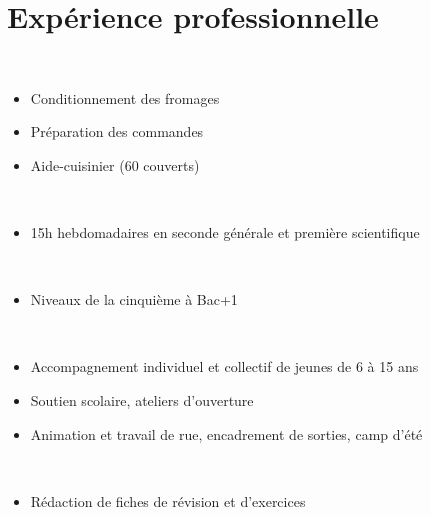 \documentclass[]{cv-template}
\begin{document}
\begin{minipage}[t]{0.65\textwidth} 

\section{Expérience professionnelle}

\\
\begin{itemize}
\item Conditionnement des fromages
\item Préparation des commandes
\item Aide-cuisinier (60 couverts)
\end{itemize}
\sectionsep

 \\
\begin{itemize}
\item 15h hebdomadaires en seconde générale et première scientifique
\end{itemize}
\sectionsep

\\
\position{}{}\vspace{-13pt}
\begin{itemize}
\item Niveaux de la cinquième à Bac+1
\end{itemize}
\sectionsep

 \\
\begin{itemize}
\item Accompagnement individuel et collectif de jeunes de 6 à 15 ans
\item Soutien scolaire, ateliers d'ouverture
\item Animation et travail de rue, encadrement de sorties, camp d'été
\end{itemize}
\sectionsep

\\
\begin{itemize}
\item Rédaction de fiches de révision et d'exercices
\end{itemize}
\sectionsep


\end{minipage}
\end{document}
